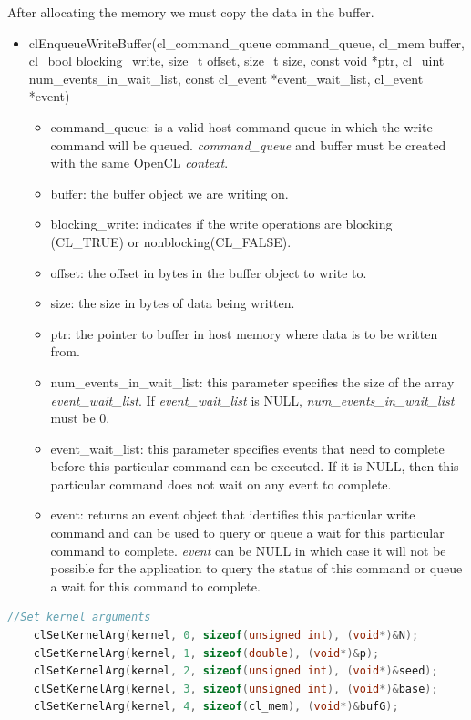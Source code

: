 \documentclass[titlepage]{article}
\begin{document}
After allocating the memory we must copy the data in the buffer.

\begin{itemize}
    \item clEnqueueWriteBuffer(cl\_command\_queue command\_queue, cl\_mem buffer, cl\_bool blocking\_write, size\_t offset, size\_t size, const void *ptr, cl\_uint num\_events\_in\_wait\_list, const cl\_event *event\_wait\_list, cl\_event *event)
    \begin{itemize}
        \item command\_queue: is a valid host command-queue in which the write command will be queued. \textit{command\_queue} and buffer must be created with the same OpenCL \textit{context}.
        \item buffer: the buffer object we are writing on.
        \item blocking\_write: indicates if the write operations are blocking (CL\_TRUE) or nonblocking(CL\_FALSE).
        \item offset: the offset in bytes in the buffer object to write to.
        \item size: the size in bytes of data being written.
        \item ptr: the pointer to buffer in host memory where data is to be written from.
        \item num\_events\_in\_wait\_list: this parameter specifies the size of the array \textit{event\_wait\_list}. If \textit{event\_wait\_list} is NULL, \textit{num\_events\_in\_wait\_list} must be 0. 
        \item event\_wait\_list: this parameter specifies events that need to complete before this particular command can be executed. If it is NULL, then this particular command does not wait on any event to complete.
        \item event: returns an event object that identifies this particular write command and can be used to query or queue a wait for this particular command to complete. \textit{event} can be NULL in which case it will not be possible for the application to query the status of this command or queue a wait for this command to complete.
    \end{itemize}
\end{itemize}

\begin{minipage}{\linewidth}
\begin{lstlisting}[language=C, style=customc, breaklines=true]
    //Set kernel arguments
    clSetKernelArg(kernel, 0, sizeof(unsigned int), (void*)&N);
    clSetKernelArg(kernel, 1, sizeof(double), (void*)&p);
    clSetKernelArg(kernel, 2, sizeof(unsigned int), (void*)&seed);
    clSetKernelArg(kernel, 3, sizeof(unsigned int), (void*)&base);
    clSetKernelArg(kernel, 4, sizeof(cl_mem), (void*)&bufG);
\end{lstlisting}
\end{minipage}
\end{document}
